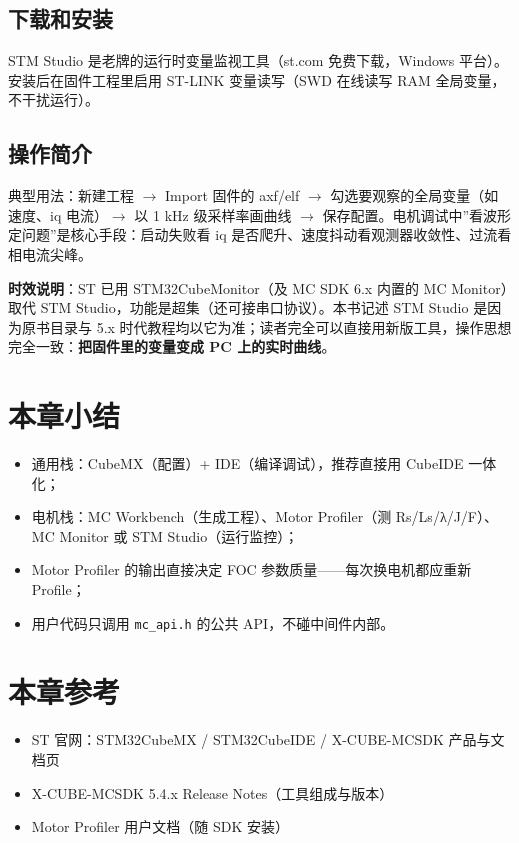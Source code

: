 \documentclass[
  UTF8,
  scheme=plain,
  fontsize=10pt,
  openany
]{ctexbook}
\begin{document}
\subsection{下载和安装}\label{ux4e0bux8f7dux548cux5b89ux88c5-5}

STM Studio 是老牌的运行时变量监视工具（st.com 免费下载，Windows
平台）。安装后在固件工程里启用 ST-LINK 变量读写（SWD 在线读写 RAM
全局变量，不干扰运行）。

\subsection{操作简介}\label{ux64cdux4f5cux7b80ux4ecb-3}

典型用法：新建工程 \(\rightarrow\) Import 固件的 axf/elf \(\rightarrow\)
勾选要观察的全局变量（如速度、iq 电流）\(\rightarrow\) 以 1 kHz
级采样率画曲线 \(\rightarrow\)
保存配置。电机调试中''看波形定问题''是核心手段：启动失败看 iq
是否爬升、速度抖动看观测器收敛性、过流看相电流尖峰。

\textbf{时效说明}：ST 已用 STM32CubeMonitor（及 MC SDK 6.x 内置的 MC
Monitor）取代 STM Studio，功能是超集（还可接串口协议）。本书记述 STM
Studio 是因为原书目录与 5.x
时代教程均以它为准；读者完全可以直接用新版工具，操作思想完全一致：\textbf{把固件里的变量变成
PC 上的实时曲线}。

\section{本章小结}\label{ux672cux7ae0ux5c0fux7ed3-2}

\begin{itemize}
\tightlist
\item
  通用栈：CubeMX（配置）+ IDE（编译调试），推荐直接用 CubeIDE 一体化；
\item
  电机栈：MC Workbench（生成工程）、Motor Profiler（测 Rs/Ls/λ/J/F）、MC
  Monitor 或 STM Studio（运行监控）；
\item
  Motor Profiler 的输出直接决定 FOC 参数质量------每次换电机都应重新
  Profile；
\item
  用户代码只调用 \texttt{mc\_api.h} 的公共 API，不碰中间件内部。
\end{itemize}

\section{本章参考}\label{ux672cux7ae0ux53c2ux8003-2}

\begin{itemize}
\tightlist
\item
  ST 官网：STM32CubeMX / STM32CubeIDE / X-CUBE-MCSDK 产品与文档页
\item
  X-CUBE-MCSDK 5.4.x Release Notes（工具组成与版本）
\item
  Motor Profiler 用户文档（随 SDK 安装）
\end{itemize}
\end{document}
